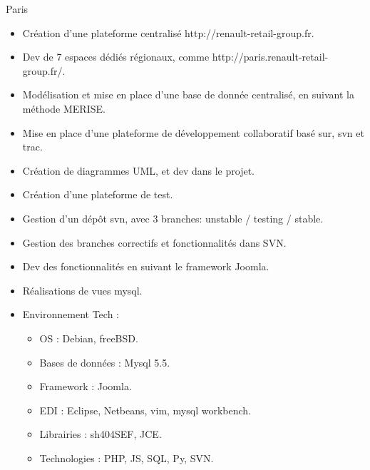 \documentclass[10pt,a4paper,sans]{moderncv}
\begin{document}
{Paris}{
  \begin{itemize}%
    \item Création d'une plateforme centralisé http://renault-retail-group.fr.
    \item Dev de 7 espaces dédiés régionaux, comme http://paris.renault-retail-group.fr/.
    \item Modélisation et mise en place d'une base de donnée centralisé, en suivant la méthode MERISE.
    \item Mise en place d'une plateforme de développement collaboratif basé sur, svn et trac.
    \item Création de diagrammes UML, et dev dans le projet.
    \item Création d'une plateforme de test.
    \item Gestion d'un dépôt svn, avec 3 branches: unstable / testing / stable.
    \item Gestion des branches correctifs et fonctionnalités dans SVN.
    \item Dev des fonctionnalités en suivant le framework Joomla.
    \item Réalisations de vues mysql.
    \item Environnement Tech :
      \begin{itemize}%
        \item OS : Debian, freeBSD.
        \item Bases de données : Mysql 5.5.
        \item Framework : Joomla.
        \item EDI : Eclipse, Netbeans, vim, mysql workbench.
        \item Librairies : sh404SEF, JCE.
        \item Technologies : PHP, JS, SQL, Py, SVN.
      \end{itemize}
  \end{itemize}}
\end{document}
